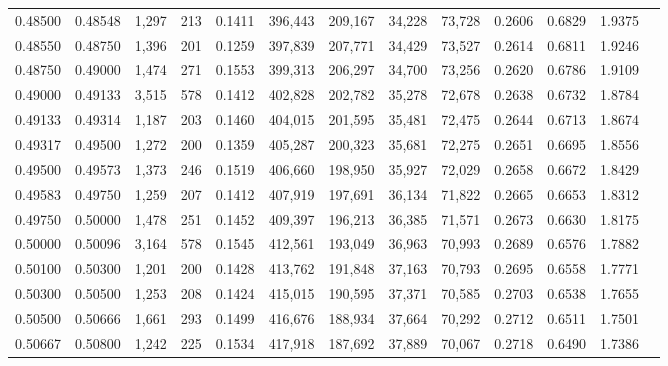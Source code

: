 \begin{tabular}{rrrrrrrrrrrrr}
0.48500 & 0.48548 & 1,297 & 213 &                                     0.1411 & 396,443 & 209,167 &  34,228 &  73,728 & 0.2606 & 0.6829 & 1.9375 \\
0.48550 & 0.48750 & 1,396 & 201 &                                     0.1259 & 397,839 & 207,771 &  34,429 &  73,527 & 0.2614 & 0.6811 & 1.9246 \\
0.48750 & 0.49000 & 1,474 & 271 &                                     0.1553 & 399,313 & 206,297 &  34,700 &  73,256 & 0.2620 & 0.6786 & 1.9109 \\
0.49000 & 0.49133 & 3,515 & 578 &                                     0.1412 & 402,828 & 202,782 &  35,278 &  72,678 & 0.2638 & 0.6732 & 1.8784 \\
0.49133 & 0.49314 & 1,187 & 203 &                                     0.1460 & 404,015 & 201,595 &  35,481 &  72,475 & 0.2644 & 0.6713 & 1.8674 \\
0.49317 & 0.49500 & 1,272 & 200 &                                     0.1359 & 405,287 & 200,323 &  35,681 &  72,275 & 0.2651 & 0.6695 & 1.8556 \\
0.49500 & 0.49573 & 1,373 & 246 &                                     0.1519 & 406,660 & 198,950 &  35,927 &  72,029 & 0.2658 & 0.6672 & 1.8429 \\
0.49583 & 0.49750 & 1,259 & 207 &                                     0.1412 & 407,919 & 197,691 &  36,134 &  71,822 & 0.2665 & 0.6653 & 1.8312 \\
0.49750 & 0.50000 & 1,478 & 251 &                                     0.1452 & 409,397 & 196,213 &  36,385 &  71,571 & 0.2673 & 0.6630 & 1.8175 \\
0.50000 & 0.50096 & 3,164 & 578 &                                     0.1545 & 412,561 & 193,049 &  36,963 &  70,993 & 0.2689 & 0.6576 & 1.7882 \\
0.50100 & 0.50300 & 1,201 & 200 &                                     0.1428 & 413,762 & 191,848 &  37,163 &  70,793 & 0.2695 & 0.6558 & 1.7771 \\
0.50300 & 0.50500 & 1,253 & 208 &                                     0.1424 & 415,015 & 190,595 &  37,371 &  70,585 & 0.2703 & 0.6538 & 1.7655 \\
0.50500 & 0.50666 & 1,661 & 293 &                                     0.1499 & 416,676 & 188,934 &  37,664 &  70,292 & 0.2712 & 0.6511 & 1.7501 \\
0.50667 & 0.50800 & 1,242 & 225 &                                     0.1534 & 417,918 & 187,692 &  37,889 &  70,067 & 0.2718 & 0.6490 & 1.7386 \\

\end{tabular}
